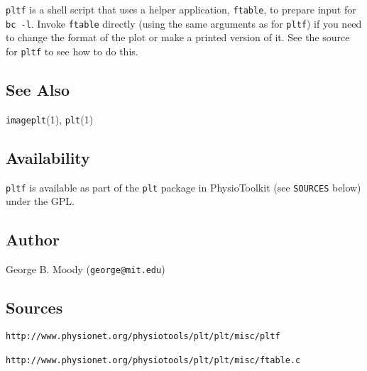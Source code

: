 \texttt{pltf} is a shell script that
uses a helper application, \texttt{ftable}, to prepare input for \texttt{bc -l}.  Invoke \texttt{ftable}
directly (using the same arguments as for \texttt{pltf}) if you need to change the
format of the plot or make a printed version of it.  See the source for
\texttt{pltf} to see how to do this. 
\subsection*{See Also}


\textsf{\texttt{imageplt}(1)}, \textsf{\texttt{plt}(1)} 
\subsection*{Availability}
\texttt{pltf}
is available as part of the \texttt{plt} package in PhysioToolkit (see \texttt{SOURCES} below)
under the GPL. 
\subsection*{Author}
George B. Moody (\texttt{george@mit.edu}) 
\subsection*{Sources}


\texttt{http://www.physionet.org/physiotools/plt/plt/misc/pltf}


\texttt{http://www.physionet.org/physiotools/plt/plt/misc/ftable.c} 
\
